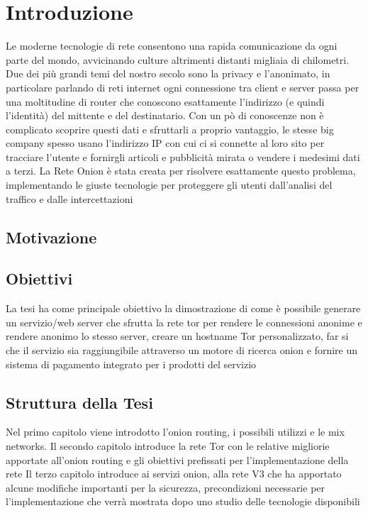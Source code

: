 \chapter{Introduzione}
\label{chap:intro}

Le moderne tecnologie di rete consentono una rapida comunicazione da ogni parte del mondo, avvicinando culture altrimenti distanti migliaia di chilometri. Due dei più grandi temi del nostro secolo sono la privacy e l'anonimato, in particolare parlando di reti internet ogni connessione tra client e server passa per una moltitudine di router che conoscono esattamente l'indirizzo (e quindi l'identità) del mittente e del destinatario. Con un pò di conoscenze non è complicato scoprire questi dati e sfruttarli a proprio vantaggio, le stesse big company spesso usano l'indirizzo IP con cui ci si connette al loro sito per tracciare l'utente e fornirgli articoli e pubblicità mirata o vendere i medesimi dati a terzi. 
La Rete Onion è stata creata per risolvere esattamente questo problema, implementando le giuste tecnologie per proteggere gli utenti dall'analisi del traffico e dalle intercettazioni

\section{Motivazione}
\section{Obiettivi}

La tesi ha come principale obiettivo la dimostrazione di come è possibile generare un servizio/web server che sfrutta la rete tor per rendere le connessioni anonime e rendere anonimo lo stesso server, creare un hostname Tor personalizzato, far si che il servizio sia raggiungibile attraverso un motore di ricerca onion e fornire un sistema di pagamento integrato per i prodotti del servizio

\section{Struttura della Tesi}
Nel primo capitolo viene introdotto l'onion routing, i possibili utilizzi e le mix networks. 
Il secondo capitolo introduce la rete Tor con le relative migliorie apportate all'onion routing e gli obiettivi prefissati per l'implementazione della rete
Il terzo capitolo introduce ai servizi onion, alla rete V3 che ha apportato alcune modifiche importanti per la sicurezza, precondizioni necessarie per l'implementazione che verrà mostrata dopo uno studio delle tecnologie disponibili
